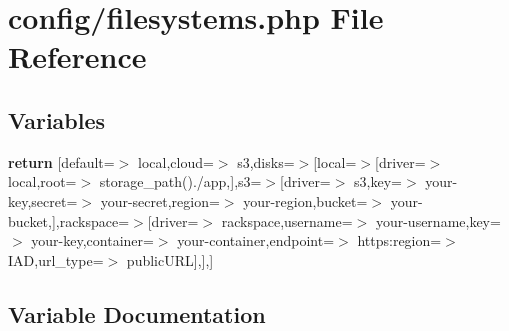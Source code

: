 \section{config/filesystems.php File Reference}
\label{filesystems_8php}
\subsection*{Variables}
\begin{DoxyCompactItemize}
\item 
{\bf return} [\textquotesingle{}default\textquotesingle{}=$>$ \textquotesingle{}local\textquotesingle{},\textquotesingle{}cloud\textquotesingle{}=$>$ \textquotesingle{}s3\textquotesingle{},\textquotesingle{}disks\textquotesingle{}=$>$[\textquotesingle{}local\textquotesingle{}=$>$[\textquotesingle{}driver\textquotesingle{}=$>$ \textquotesingle{}local\textquotesingle{},\textquotesingle{}root\textquotesingle{}=$>$ storage\+\_\+path().\textquotesingle{}/app\textquotesingle{},],\textquotesingle{}s3\textquotesingle{}=$>$[\textquotesingle{}driver\textquotesingle{}=$>$ \textquotesingle{}s3\textquotesingle{},\textquotesingle{}key\textquotesingle{}=$>$ \textquotesingle{}your-\/key\textquotesingle{},\textquotesingle{}secret\textquotesingle{}=$>$ \textquotesingle{}your-\/secret\textquotesingle{},\textquotesingle{}region\textquotesingle{}=$>$ \textquotesingle{}your-\/region\textquotesingle{},\textquotesingle{}bucket\textquotesingle{}=$>$ \textquotesingle{}your-\/bucket\textquotesingle{},],\textquotesingle{}rackspace\textquotesingle{}=$>$[\textquotesingle{}driver\textquotesingle{}=$>$ \textquotesingle{}rackspace\textquotesingle{},\textquotesingle{}username\textquotesingle{}=$>$ \textquotesingle{}your-\/username\textquotesingle{},\textquotesingle{}key\textquotesingle{}=$>$ \textquotesingle{}your-\/key\textquotesingle{},\textquotesingle{}container\textquotesingle{}=$>$ \textquotesingle{}your-\/container\textquotesingle{},\textquotesingle{}endpoint\textquotesingle{}=$>$ \textquotesingle{}https\+:\textquotesingle{}region\textquotesingle{}=$>$ \textquotesingle{}I\+A\+D\textquotesingle{},\textquotesingle{}url\+\_\+type\textquotesingle{}=$>$ \textquotesingle{}public\+U\+R\+L\textquotesingle{}],],]
\end{DoxyCompactItemize}


\subsection{Variable Documentation}
